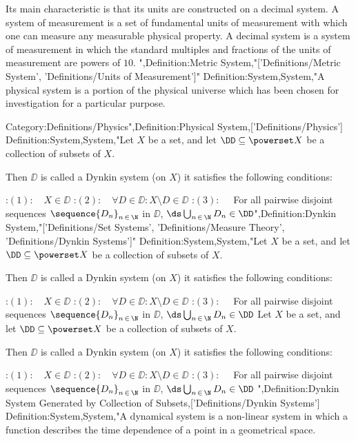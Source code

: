 Its main characteristic is that its units are constructed on a decimal system.
A system of measurement is a set of fundamental units of measurement with which one can measure any measurable physical property.
A decimal system is a system of measurement in which the standard multiples and fractions of the units of measurement are powers of $10$.
",Definition:Metric System,"['Definitions/Metric System', 'Definitions/Units of Measurement']"
Definition:System,System,"A physical system is a portion of the physical universe which has been chosen for investigation for a particular purpose.


Category:Definitions/Physics",Definition:Physical System,['Definitions/Physics']
Definition:System,System,"Let $X$ be a set, and let $\DD \subseteq \powerset X$ be a collection of subsets of $X$.


Then $\DD$ is called a Dynkin system (on $X$)  it satisfies the following conditions:

:$(1): \quad X \in \DD$
:$(2): \quad \forall D \in \DD: X \setminus D \in \DD$
:$(3): \quad$ For all pairwise disjoint sequences $\sequence {D_n}_{n \mathop \in \N}$ in $\DD$, $\ds \bigcup_{n \mathop \in \N} D_n \in \DD$",Definition:Dynkin System,"['Definitions/Set Systems', 'Definitions/Measure Theory', 'Definitions/Dynkin Systems']"
Definition:System,System,"Let $X$ be a set, and let $\DD \subseteq \powerset X$ be a collection of subsets of $X$.


Then $\DD$ is called a Dynkin system (on $X$)  it satisfies the following conditions:

:$(1): \quad X \in \DD$
:$(2): \quad \forall D \in \DD: X \setminus D \in \DD$
:$(3): \quad$ For all pairwise disjoint sequences $\sequence {D_n}_{n \mathop \in \N}$ in $\DD$, $\ds \bigcup_{n \mathop \in \N} D_n \in \DD$
Let $X$ be a set, and let $\DD \subseteq \powerset X$ be a collection of subsets of $X$.


Then $\DD$ is called a Dynkin system (on $X$)  it satisfies the following conditions:

:$(1): \quad X \in \DD$
:$(2): \quad \forall D \in \DD: X \setminus D \in \DD$
:$(3): \quad$ For all pairwise disjoint sequences $\sequence {D_n}_{n \mathop \in \N}$ in $\DD$, $\ds \bigcup_{n \mathop \in \N} D_n \in \DD$
",Definition:Dynkin System Generated by Collection of Subsets,['Definitions/Dynkin Systems']
Definition:System,System,"A dynamical system is a non-linear system in which a function describes the time dependence of a point in a geometrical space.


